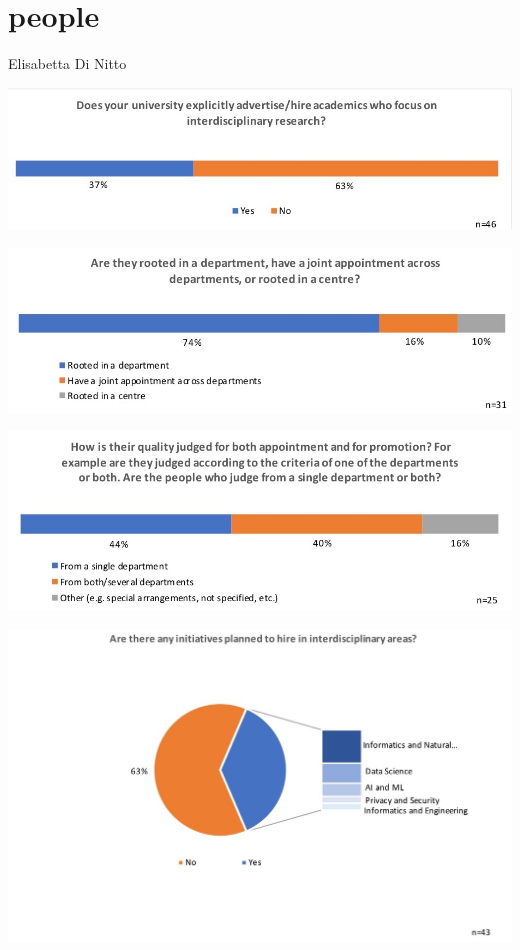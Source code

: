 \section{people}

Elisabetta Di Nitto

\includegraphics[width = \linewidth]{charts/3a.jpg}


\includegraphics[width = \linewidth]{charts/3b.jpg}


\includegraphics[width = \linewidth]{charts/3c.jpg}


\includegraphics[width = \linewidth]{charts/3d.jpg}
